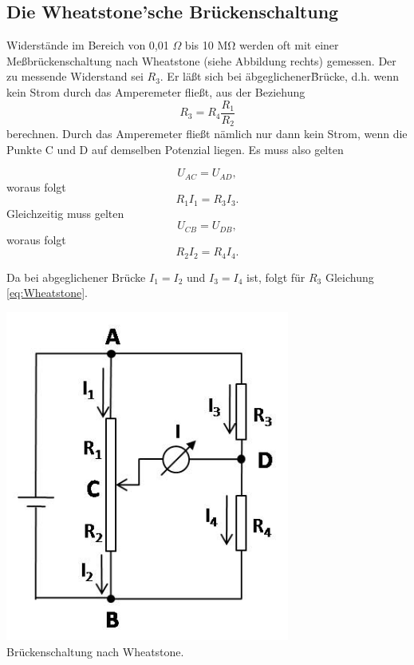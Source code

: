 \subsection{Die Wheatstone'sche Brückenschaltung} \label{chap:Wheatstone}

Widerstände im Bereich von 0,01 $\Omega$ bis 10 M$\mathrm{\Omega}$ werden oft mit einer Meßbrückenschaltung nach Wheatstone (siehe Abbildung rechts) gemessen. Der zu messende Widerstand sei $R_3$. Er läßt sich bei \"abgeglichener\" Brücke, d.h. wenn kein Strom durch das Amperemeter fließt, aus der Beziehung
\begin{equation}
 R_3 = R_4\frac{R_1}{R_2}
 \label{eq:Wheatstone}
\end{equation}
berechnen. Durch das Amperemeter fließt nämlich nur dann kein Strom, wenn die Punkte C und D auf demselben Potenzial liegen. Es muss also gelten

\begin{minipage}[b]{0.5\textwidth}
\begin{equation}
 U_{AC} = U_{AD},
\end{equation}
woraus folgt
\begin{equation}
 R_1 I_1 = R_3 I_3.
\end{equation}
Gleichzeitig muss gelten
\begin{equation}
 U_{CB} = U_{DB},
\end{equation}
woraus folgt
\begin{equation}
 R_2 I_2 = R_4 I_4.
\end{equation}

Da bei abgeglichener Brücke $I_1 = I_2$ und $I_3 = I_4$ ist, folgt für $R_3$ Gleichung \ref{eq:Wheatstone}.
\end{minipage}
%
\begin{minipage}[b]{0.5\textwidth}
 \centering
 \includegraphics[width=0.7\textwidth]{Abbildungen/Wheatstone_Prinzip.jpg}\\
 Brückenschaltung nach Wheatstone.
\end{minipage}



